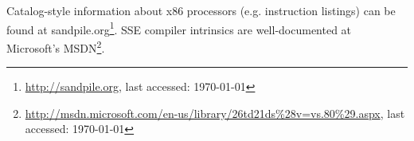 Catalog-style information about x86 processors (e.g. instruction listings) can be found at sandpile.org\footnote{\url{http://sandpile.org}, last accessed: \today{}}. SSE compiler intrinsics are well-documented at Microsoft's MSDN\footnote{\url{http://msdn.microsoft.com/en-us/library/26td21ds\%28v=vs.80\%29.aspx}, last accessed: \today{}}.
